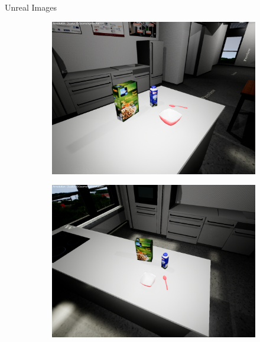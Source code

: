 \documentclass[]{beamer}
\begin{document}
\begin{frame}{Unreal Images}
\begin{figure}
	\quad
	\begin{subfigure}[b]{0.3\textwidth}
		\includegraphics[scale=.08]{../thesis/img/chapter3/sceneEx_3}	
	\end{subfigure}
	\quad
	\begin{subfigure}[b]{0.3\textwidth}
		\includegraphics[scale=.08]{../thesis/img/chapter3/sceneEx_4}	
	\end{subfigure}
	\quad
	\begin{subfigure}[b]{0.3\textwidth}

\end{subfigure}
\end{figure}
\end{frame}
\end{document}

